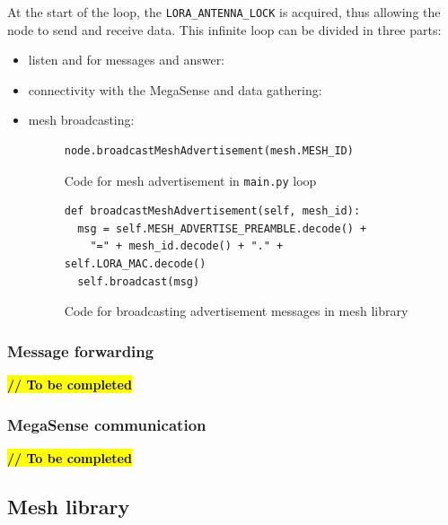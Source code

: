 				At the start of the loop, the \texttt{LORA\_ANTENNA\_LOCK} is acquired, thus allowing the node to send and receive data.
				This infinite loop can be divided in three parts:
				\begin{itemize}
					\item listen and for messages and answer:
					\item connectivity with the MegaSense and data gathering:
					\item mesh broadcasting:
						\begin{figure}[H]
							\begin{lstlisting}
node.broadcastMeshAdvertisement(mesh.MESH_ID)
							\end{lstlisting}
							\caption{Code for mesh advertisement in \texttt{main.py} loop}
							\label{code:mesh_advertisement_main}
						\end{figure}
					
						\begin{figure}
							\begin{lstlisting}
def broadcastMeshAdvertisement(self, mesh_id):
  msg = self.MESH_ADVERTISE_PREAMBLE.decode() + 
    "=" + mesh_id.decode() + "." + self.LORA_MAC.decode()
  self.broadcast(msg)
							\end{lstlisting}
							\caption{Code for broadcasting advertisement messages in mesh library}
							\label{code:mesh_advertisement_library}
						\end{figure}

				\end{itemize}	
			
			\subsubsection{Message forwarding}
			
				\textbf{\textcolor{red}{\hl{// To be completed}}}
			
			\subsubsection{MegaSense communication}
			
				\textbf{\textcolor{red}{\hl{// To be completed}}}
			
		\subsection{Mesh library}\label{subsec:mesh_library}
		

